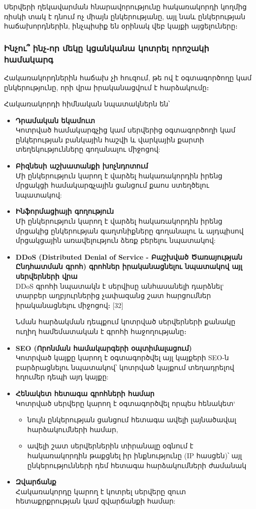 \documentclass[a4paper,12pt]{article}
\begin{document}
\begin{sloppypar}
Սերվերի ղեկավարման հնարավորությունը հակառակորդի կողմից ռիսկի տակ է
դնում ոչ միայն ընկերությանը, այլ նաև ընկերության հաճախորդներին, ինչպիսիք են
օրինակ վեբ կայքի այցելուները։


\subsubsection{Ինչու՞ ինչ֊որ մեկը կցանկանա կոտրել որոշակի համակարգ}


Հակառակորդներին հաճախ չի հուզում, թե ով է օգտագործողը կամ ընկերությունը,
որի վրա իրականացվում է հարձակումը։

Հակառակորդի հիմնական նպատակներն են՝

\begin{itemize}
\item \textbf{Դրամական եկամուտ} \\
	Կոտրված համակարգչից կամ սերվերից օգտագործողի
    կամ ընկերության բանկային հաշվի և վարկային քարտի տեղեկությունները
    գողանալու միջոցով:
\item \textbf{Բիզնեսի աշխատանքի խոչնդոտում} \\
	Մի ընկերություն կարող է վարձել
    հակառակորդին իրենց մրցակցի համակարգչային ցանցում քաոս ստեղծելու
    նպատակով:
\item \textbf{Ինֆորմացիայի գողություն} \\
	Մի ընկերություն կարող է վարձել
    հակառակորդին իրենց մրցակից ընկերության գաղտնիքները գողանալու և
    այդպիսով մրցակցային առավելություն ձեռք բերելու նպատակով:
\item \textbf{DDoS (Distributed Denial of Service - Բաշխված Ծառայության Ընդհատման գրոհ) գրոհներ
    իրականացնելու նպատակով այլ սերվերների վրա} \\
	DDoS գրոհի նպատակն է սերվիսը անհասանելի դարձնել`
	տարբեր աղբյուրներից չափազանց շատ հարցումներ
	իրականացնելու միջոցով։ [32]
	
    Նման հարձակման դեպքում կոտրված սերվերների քանակը
	ուղիղ համեմատական է գրոհի հաջողությանը։
\item \textbf{SEO (Որոնման համակարգերի օպտիմալացում)} \\
	Կոտրված կայքը կարող է
    օգտագործվել այլ կայքերի SEO-ն բարձրացնելու նպատակով՝ կոտրված կայքում
    տեղադրելով հղումեր դեպի այդ կայքը:
\item \textbf{Հենակետ հետագա գրոհների համար} \\
	Կոտրված սերվերը կարող է օգտագործվել
	որպես հենակետ`
	\begin{itemize}
	\item նույն ընկերության ցանցում հետագա ավելի լայնածավալ հարձակումների
		համար,
	\item ավելի շատ սերվերներին տիրանալը օգնում է հակառակորդին թաքցնել
		իր ինքնությունը (IP հասցեն)՝ այլ ընկերությունների դեմ հետագա
		հարձակումների ժամանակ
	\end{itemize}
\item \textbf{Զվարճանք} \\
	Հակառակորդը կարող է կոտրել սերվերը զուտ հետաքրքրության կամ
    զվարճանքի համար:
\end{itemize}



\end{sloppypar}
\end{document}
